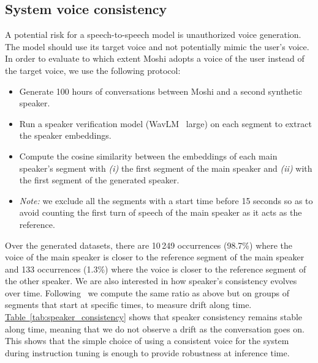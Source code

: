 \subsection{System voice consistency}
\label{sec:voice_consistency}
A potential risk for a speech-to-speech model is unauthorized voice generation.
The model should use its target voice and not potentially mimic the user's voice.
In order to evaluate to which extent Moshi adopts a voice of the user instead of the target voice, we use the following protocol:
\begin{itemize}
\item Generate 100 hours of conversations between Moshi and a second synthetic speaker.
\item Run a speaker verification model (WavLM~\citep{wavlm} large) on each segment to extract the speaker embeddings.
\item Compute the cosine similarity between the embeddings of each main speaker's segment with \emph{(i)} the first segment of the main speaker and \emph{(ii)} with the first segment of the generated speaker.
\item \noindent \textit{Note:} we exclude all the segments with a start time before 15 seconds so as to avoid counting the first turn of speech of the main speaker as it acts as the reference.
\end{itemize}

Over the generated datasets, there are 10\,249 occurrences (98.7\%) where the voice of the main speaker is closer to the reference segment of the main speaker and 133 occurrences (1.3\%) where the voice is closer to the reference segment of the other speaker.
We are also interested in how speaker's consistency evolves over time. Following~\citet{soundstorm} we compute the same
ratio as above but on groups of segments that start at specific times, to measure drift along time. \hyperref[tab:speaker_consistency]{Table~\ref{tab:speaker_consistency}} shows that speaker consistency remains stable along time, meaning that we do not observe a drift as the conversation goes on. This shows that the simple choice of using a consistent voice for the system during instruction tuning is enough to provide robustness at inference time.

\begin{table}[t]
\caption{\textbf{Speaker consistency along time.} We measure how often the speaker embedding from Moshi's segment is closer to its reference segment than the user, when computing speaker embeddings from segments further away from the reference.}
\label{tab:speaker_consistency}
\centering 
{\scriptsize
{}}
\end{table}



